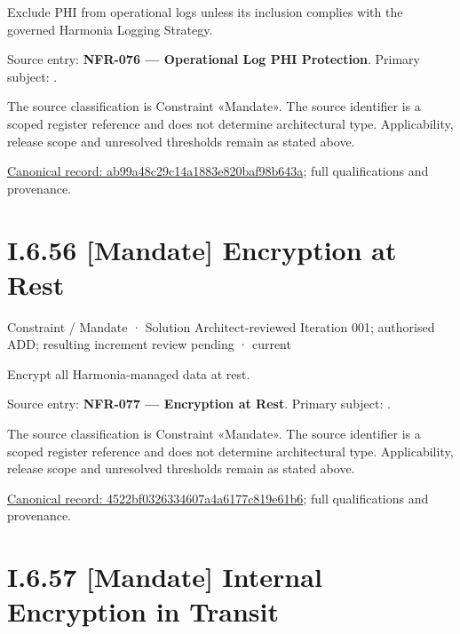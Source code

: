 Exclude PHI from operational logs unless its inclusion complies with the governed Harmonia Logging Strategy.



Source entry: \textbf{NFR-076 — Operational Log PHI Protection}. Primary subject: \texttt{}.



The source classification is Constraint «Mandate». The source identifier is a scoped register reference and does not determine architectural type. Applicability, release scope and unresolved thresholds remain as stated above.


{\footnotesize \href{../../../../continuum/motivation/constraint/mandate/ab99a48c29c14a1883e820baf98b643a.md}{Canonical record: ab99a48c29c14a1883e820baf98b643a}; full qualifications and provenance.}\par
\section*{I.6.56 [Mandate] Encryption at Rest}
\label{navigation:I.6.56}

\label{element:4522bf0326334607a4a6177c819e61b6}
{\small Constraint / Mandate · Solution Architect-reviewed Iteration 001; authorised ADD; resulting increment review pending · current}\par

Encrypt all Harmonia-managed data at rest.



Source entry: \textbf{NFR-077 — Encryption at Rest}. Primary subject: \texttt{}.



The source classification is Constraint «Mandate». The source identifier is a scoped register reference and does not determine architectural type. Applicability, release scope and unresolved thresholds remain as stated above.


{\footnotesize \href{../../../../continuum/motivation/constraint/mandate/4522bf0326334607a4a6177c819e61b6.md}{Canonical record: 4522bf0326334607a4a6177c819e61b6}; full qualifications and provenance.}\par
\section*{I.6.57 [Mandate] Internal Encryption in Transit}
\label{navigation:I.6.57}

